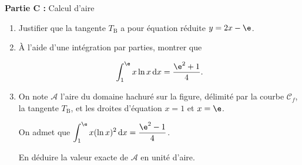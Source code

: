 \begin{center}\textbf{Partie C :} Calcul d'aire\end{center}

\begin{enumerate}
\item Justifier que la tangente $T_{\text{B}}$ a pour équation réduite $y = 2x - \e$.


\item À l'aide d'une intégration par parties, montrer que

\[\displaystyle\int_1^{\e} x\ln x\, \text{d}x = \dfrac{\e^2 + 1}{4}.\]
\item On note $\mathcal{A}$ l'aire du domaine hachuré sur la figure, délimité par la courbe $\mathcal{C}_f$, la tangente $T_{\text{B}}$, et les droites d'équation $x = 1$ et $x = \e$.

On admet que $\displaystyle\int_1^{\e} x(\ln x)^2\,\text{d}x = \dfrac{\e^2 - 1}{4}$.

En déduire la valeur exacte de $\mathcal{A}$ en unité d'aire.
\end{enumerate}

\bigskip
